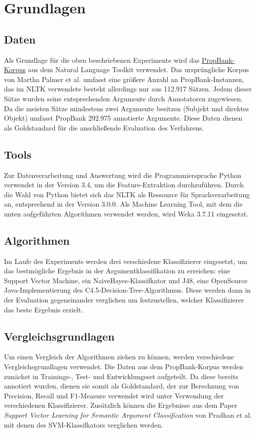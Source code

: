 \documentclass[runningheads]{llncs}
\begin{document}
\section{Grundlagen}

\subsection{Daten}

Als Grundlage f\"ur die oben beschriebenen Experimente wird das \href{http://www.nltk.org/_modules/nltk/corpus/reader/propbank.html}{PropBank-Korpus} aus dem Natural Language Toolkit verwendet. Das urspr\"ungliche Korpus von Martha Palmer et al. \cite{Palmer} umfasst eine gr\"o{\ss}ere Anzahl an PropBank-Instanzen, das im NLTK verwendete besteht allerdings nur aus 112.917 S\"atzen. 
Jedem dieser S\"atze wurden seine entsprechenden Argumente durch Annotatoren zugewiesen. Da die meisten S\"atze mindestens zwei Argumente besitzen (Subjekt und direktes Objekt) umfasst PropBank 292.975 annotierte Argumente. Diese Daten dienen als Goldstandard f\"ur die anschlie{\ss}ende Evaluation des Verfahrens.



\subsection{Tools}
Zur Datenverarbeitung und Auswertung wird die Programmiersprache Python verwendet in der Version 3.4, um die Feature-Extraktion durchzuf\"uhren. Durch die Wahl von Python bietet sich das NLTK als Ressource f\"ur Sprachverarbeitung an, entsprechend in der Version 3.0.0. Als Machine Learning Tool, mit dem die unten aufgef\"uhrten
Algorithmen verwendet werden, wird Weka 3.7.11 eingesetzt.

\subsection{Algorithmen}
Im Laufe des Experiments werden drei verschiedene Klassifizierer eingesetzt, um das bestm\"ogliche Ergebnis in der Argumentklassifikation zu erreichen: eine Support Vector
Machine, ein NaiveBayes-Klassifkator und J48, eine OpenSource Java-Implementierung des C4.5-Decision-Tree-Algorithmus. Diese werden dann in der Evaluation gegeneinander 
verglichen um festzustellen, welcher Klassifizierer das beste Ergebnis erzielt. 

\subsection{Vergleichsgrundlagen}
Um einen Vergleich der Algorithmen ziehen zu k\"onnen, werden verschiedene Vergleichsgrundlagen verwendet. Die Daten aus dem PropBank-Korpus werden zun\"achst in Trainings-, Test- und 
Entwicklungsset aufgeteilt. Da diese bereits annotiert wurden, dienen sie somit als Goldstandard, der zur Berechnung von Precision, Recall und F1-Measure verwendet wird unter Verwendung
der verschiedenen Klassifizierer. Zus\"atzlich k\"onnen die Ergebnisse aus dem Paper \textit{Support Vector Learning for Semantic Argument Classiﬁcation} von Pradhan et al. mit denen des SVM-Klassifkators verglichen werden.
\end{document}
